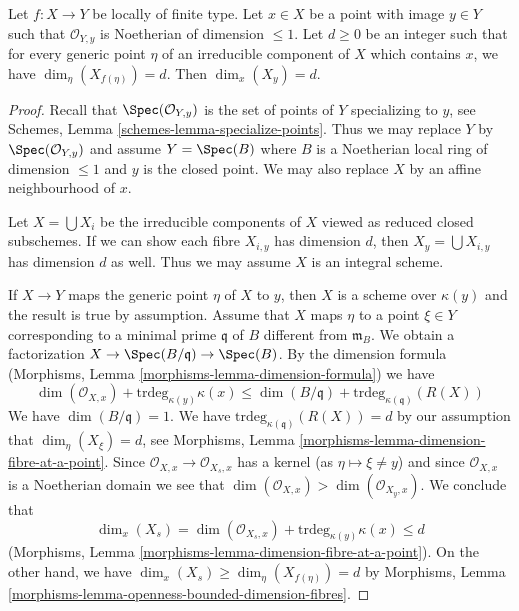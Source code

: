 \begin{lemma}
\label{lemma-dimension-fibre-in-codim-1}
Let $f : X \to Y$ be locally of finite type. Let $x \in X$ be a point
with image $y \in Y$ such that $\mathcal{O}_{Y, y}$ is Noetherian of
dimension $\leq 1$. Let $d \geq 0$ be an integer such that for every
generic point $\eta$ of an irreducible component of $X$ which contains
$x$, we have $\dim_\eta(X_{f(\eta)}) = d$. Then $\dim_x(X_y) = d$.
\end{lemma}

\begin{proof}
Recall that $\Spec(\mathcal{O}_{Y, y})$
is the set of points of $Y$ specializing to $y$, see
Schemes, Lemma \ref{schemes-lemma-specialize-points}.
Thus we may replace $Y$ by $\Spec(\mathcal{O}_{Y, y})$
and assume $Y = \Spec(B)$ where $B$ is a Noetherian
local ring of dimension $\leq 1$ and $y$ is the closed point.
We may also replace $X$ by an affine neighbourhood of $x$.

\medskip\noindent
Let $X = \bigcup X_i$ be the irreducible components of $X$ viewed
as reduced closed subschemes. If we can show each fibre $X_{i, y}$
has dimension $d$, then $X_y = \bigcup X_{i, y}$ has dimension $d$ as
well. Thus we may assume $X$ is an integral scheme.

\medskip\noindent
If $X \to Y$ maps the generic point $\eta$ of $X$ to $y$, then $X$
is a scheme over $\kappa(y)$ and the result is true by assumption.
Assume that $X$ maps $\eta$ to a point $\xi \in Y$ corresponding
to a minimal prime $\mathfrak q$ of $B$ different from $\mathfrak m_B$.
We obtain a factorization $X \to \Spec(B/\mathfrak q) \to \Spec(B)$.
By the dimension formula
(Morphisms, Lemma \ref{morphisms-lemma-dimension-formula})
we have
$$
\dim(\mathcal{O}_{X, x}) + \text{trdeg}_{\kappa(y)} \kappa(x) \leq
\dim(B/\mathfrak q) + \text{trdeg}_{\kappa(\mathfrak q)}(R(X))
$$
We have $\dim(B/\mathfrak q) = 1$. We have
$\text{trdeg}_{\kappa(\mathfrak q)}(R(X)) = d$ by
our assumption that $\dim_\eta(X_\xi) = d$, see
Morphisms, Lemma \ref{morphisms-lemma-dimension-fibre-at-a-point}.
Since $\mathcal{O}_{X, x} \to \mathcal{O}_{X_s, x}$ has a kernel
(as $\eta \mapsto \xi \not = y$) and since $\mathcal{O}_{X, x}$
is a Noetherian domain we see that
$\dim(\mathcal{O}_{X, x}) > \dim(\mathcal{O}_{X_y, x})$.
We conclude that
$$
\dim_x(X_s) =
\dim(\mathcal{O}_{X_s, x}) + \text{trdeg}_{\kappa(y)} \kappa(x) \leq d
$$
(Morphisms, Lemma \ref{morphisms-lemma-dimension-fibre-at-a-point}).
On the other hand, we have
$\dim_x(X_s) \geq \dim_\eta(X_{f(\eta)}) = d$ by
Morphisms, Lemma \ref{morphisms-lemma-openness-bounded-dimension-fibres}.
\end{proof}

